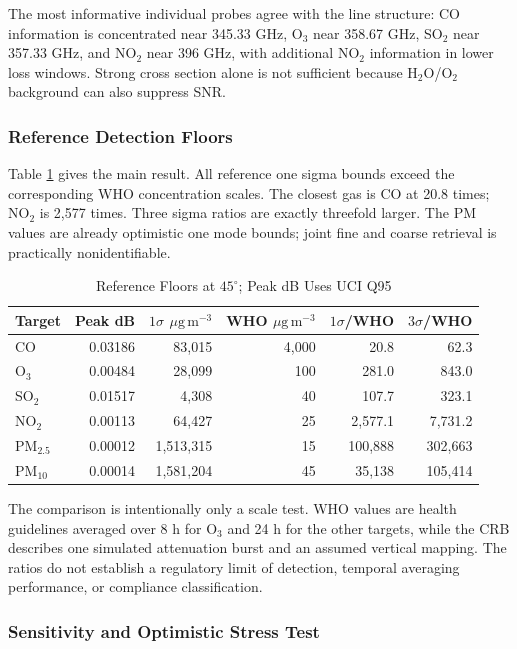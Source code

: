 \documentclass[conference]{IEEEtran}
\newcommand{\ugm}{\ensuremath{\mu\mathrm{g\,m}^{-3}}}
\newcommand{\pmfive}{PM$_{2.5}$}
\newcommand{\pmten}{PM$_{10}$}
\begin{document}
The most informative individual probes agree with the line structure: CO information is concentrated near 345.33 GHz, O$_3$ near 358.67 GHz, SO$_2$ near 357.33 GHz, and NO$_2$ near 396 GHz, with additional NO$_2$ information in lower loss windows. Strong cross section alone is not sufficient because H$_2$O/O$_2$ background can also suppress SNR.

\subsubsection{Reference Detection Floors}

Table \ref{tab:floors} gives the main result. All reference one sigma bounds exceed the corresponding WHO concentration scales. The closest gas is CO at 20.8 times; NO$_2$ is 2,577 times. Three sigma ratios are exactly threefold larger. The PM values are already optimistic one mode bounds; joint fine and coarse retrieval is practically nonidentifiable.

\begin{table}[t]
\caption{Reference Floors at $45^\circ$; Peak dB Uses UCI Q95}
\label{tab:floors}
\centering
\scriptsize
\setlength{\tabcolsep}{2.5pt}
\begin{tabular}{@{}lrrrrr@{}}
\toprule
Target & Peak dB & $1\sigma$ \ugm & WHO \ugm & $1\sigma$/WHO & $3\sigma$/WHO \\
\midrule
CO & 0.03186 & 83,015 & 4,000 & 20.8 & 62.3 \\
O$_3$ & 0.00484 & 28,099 & 100 & 281.0 & 843.0 \\
SO$_2$ & 0.01517 & 4,308 & 40 & 107.7 & 323.1 \\
NO$_2$ & 0.00113 & 64,427 & 25 & 2,577.1 & 7,731.2 \\
\pmfive & 0.00012 & 1,513,315 & 15 & 100,888 & 302,663 \\
\pmten & 0.00014 & 1,581,204 & 45 & 35,138 & 105,414 \\
\bottomrule
\end{tabular}
\end{table}

The comparison is intentionally only a scale test. WHO values are health guidelines averaged over 8 h for O$_3$ and 24 h for the other targets, while the CRB describes one simulated attenuation burst and an assumed vertical mapping. The ratios do not establish a regulatory limit of detection, temporal averaging performance, or compliance classification.

\subsubsection{Sensitivity and Optimistic Stress Test}
\end{document}
